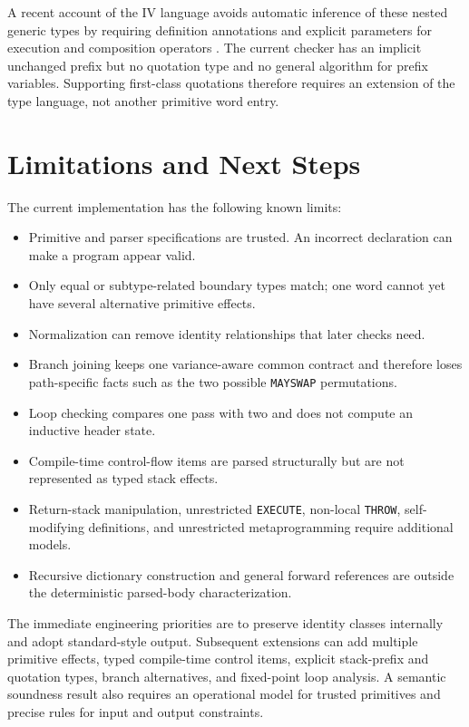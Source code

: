 \documentclass[11pt,a4paper]{article}
\begin{document}
A recent account of the IV language avoids automatic inference of these nested
generic types by requiring definition annotations and explicit parameters for
execution and composition operators \cite{dinikeev2025}.  The current checker
has an implicit unchanged prefix but no quotation type and no general
algorithm for prefix variables.  Supporting first-class quotations therefore
requires an extension of the type language, not another primitive word entry.

\section{Limitations and Next Steps}

The current implementation has the following known limits:

\begin{itemize}
  \item Primitive and parser specifications are trusted.  An incorrect
        declaration can make a program appear valid.
  \item Only equal or subtype-related boundary types match; one word cannot
        yet have several alternative primitive effects.
  \item Normalization can remove identity relationships that later checks
        need.
  \item Branch joining keeps one variance-aware common contract and therefore
        loses path-specific facts such as the two possible \texttt{MAYSWAP}
        permutations.
  \item Loop checking compares one pass with two and does not compute an
        inductive header state.
  \item Compile-time control-flow items are parsed structurally but are not
        represented as typed stack effects.
  \item Return-stack manipulation, unrestricted \texttt{EXECUTE}, non-local
        \texttt{THROW}, self-modifying definitions, and unrestricted
        metaprogramming require additional models.
  \item Recursive dictionary construction and general forward references are
        outside the deterministic parsed-body characterization.
\end{itemize}

The immediate engineering priorities are to preserve identity classes
internally and adopt standard-style output.  Subsequent extensions can add multiple
primitive effects, typed compile-time control items, explicit stack-prefix and
quotation types, branch alternatives, and fixed-point loop analysis.  A
semantic soundness result also requires an operational model for trusted
primitives and precise rules for input and output constraints.
\end{document}
